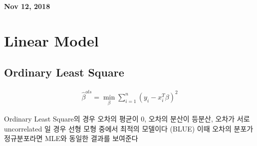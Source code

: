 \documentclass[11pt]{article}
\begin{document}
%

\newcommand{\Ito}{$It\hat{o}$'$s~Lemma$}

\newcommand\ind{\stackrel{\rm ind}{\sim}}
\newcommand\iid{\stackrel{\rm iid}{\sim}}
\renewcommand\c{\mathbf{c}}
\newcommand\y{\mathbf{y}}
\newcommand\z{\mathbf{z}}
\renewcommand\P{\mathbf{P}}
\newcommand\W{\mathbf{W}}
\newcommand\X{\mathbf{X}}
\newcommand\Y{\mathbf{Y}}
\newcommand\Z{\mathbf{Z}}
\newcommand\J{{\cal J}}
\newcommand\B{{\cal B}}
\newcommand\K{{\cal K}}
\newcommand\N{{\rm N}}
\newcommand\bs{\boldsymbol}
\newcommand\bth{\bs\theta}
\newcommand\bbe{\bs\beta}
\renewcommand\*{^\star}

\def\spacingset#1{\renewcommand{\baselinestretch}%
{#1}\small\normalsize} \spacingset{1}



  \bigskip
  \bigskip
  \bigskip
  \begin{center}
    {\LARGE\bf Nov 12, 2018 }
  \end{center}
  \medskip



\spacingset{1.45}











\section{Linear Model} 
\subsection{Ordinary Least Square}


  \begin{align}
    \hat{\beta}^{ols} = \min_{\beta} \sum\limits_{i=1}^n (y_{i} - x_{i}^T \beta)^2 
  \end{align}


Ordinary Least Square의 경우 오차의 평균이 0, 오차의 분산이 등분산, 오차가 서로 uncorrelated 일 경우 선형 모형 중에서 최적의 모델이다 (BLUE) 이때 오차의 분포가 정규분포라면 MLE와 동일한 결과를 보여준다
\end{document}
